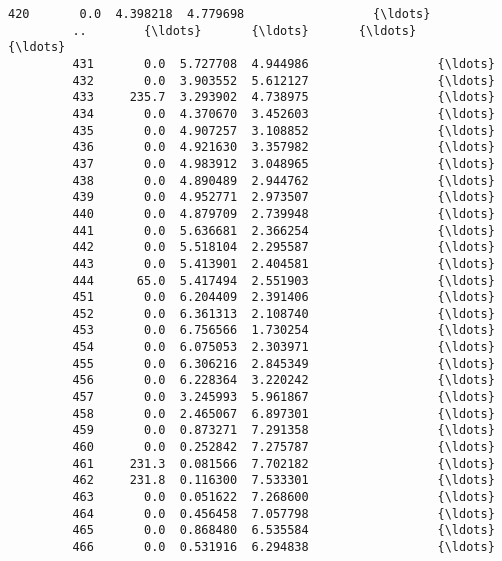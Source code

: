 \documentclass[11pt]{article}
\begin{document}
\begin{Verbatim}[commandchars=\\\{\}]
         420       0.0  4.398218  4.779698                  {\ldots}                    
         ..        {\ldots}       {\ldots}       {\ldots}                  {\ldots}                    
         431       0.0  5.727708  4.944986                  {\ldots}                    
         432       0.0  3.903552  5.612127                  {\ldots}                    
         433     235.7  3.293902  4.738975                  {\ldots}                    
         434       0.0  4.370670  3.452603                  {\ldots}                    
         435       0.0  4.907257  3.108852                  {\ldots}                    
         436       0.0  4.921630  3.357982                  {\ldots}                    
         437       0.0  4.983912  3.048965                  {\ldots}                    
         438       0.0  4.890489  2.944762                  {\ldots}                    
         439       0.0  4.952771  2.973507                  {\ldots}                    
         440       0.0  4.879709  2.739948                  {\ldots}                    
         441       0.0  5.636681  2.366254                  {\ldots}                    
         442       0.0  5.518104  2.295587                  {\ldots}                    
         443       0.0  5.413901  2.404581                  {\ldots}                    
         444      65.0  5.417494  2.551903                  {\ldots}                    
         451       0.0  6.204409  2.391406                  {\ldots}                    
         452       0.0  6.361313  2.108740                  {\ldots}                    
         453       0.0  6.756566  1.730254                  {\ldots}                    
         454       0.0  6.075053  2.303971                  {\ldots}                    
         455       0.0  6.306216  2.845349                  {\ldots}                    
         456       0.0  6.228364  3.220242                  {\ldots}                    
         457       0.0  3.245993  5.961867                  {\ldots}                    
         458       0.0  2.465067  6.897301                  {\ldots}                    
         459       0.0  0.873271  7.291358                  {\ldots}                    
         460       0.0  0.252842  7.275787                  {\ldots}                    
         461     231.3  0.081566  7.702182                  {\ldots}                    
         462     231.8  0.116300  7.533301                  {\ldots}                    
         463       0.0  0.051622  7.268600                  {\ldots}                    
         464       0.0  0.456458  7.057798                  {\ldots}                    
         465       0.0  0.868480  6.535584                  {\ldots}                    
         466       0.0  0.531916  6.294838                  {\ldots}                    
         

\end{Verbatim}
\end{document}
